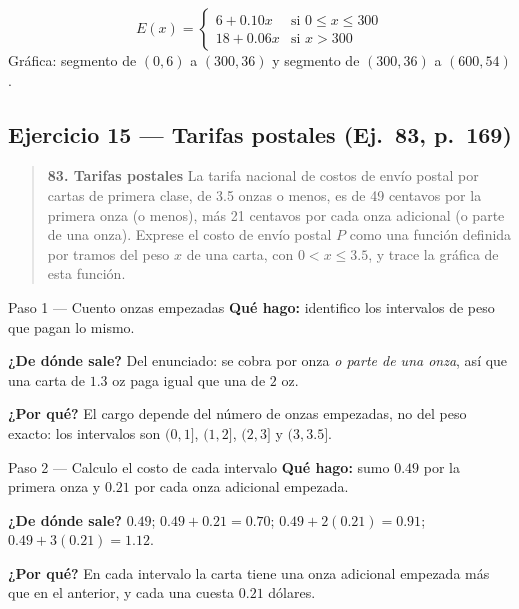 \documentclass[11pt]{article}
\begin{document}
\begin{resp}
\[
E(x)=\begin{cases}6+0.10x & \text{si } 0\le x\le 300\\ 18+0.06x & \text{si } x>300\end{cases}
\]
Gráfica: segmento de $(0,6)$ a $(300,36)$ y segmento de $(300,36)$ a $(600,54)$.
\end{resp}

\subsection*{Ejercicio 15 — Tarifas postales (Ej.~83, p.~169)}

\begin{quote}
\textbf{83. Tarifas postales} \quad La tarifa nacional de costos de envío postal por cartas de primera clase, de 3.5 onzas o menos, es de 49 centavos por la primera onza (o menos), más 21 centavos por cada onza adicional (o parte de una onza). Exprese el costo de envío postal $P$ como una función definida por tramos del peso $x$ de una carta, con $0<x\le 3.5$, y trace la gráfica de esta función.
\end{quote}

\begin{paso}{Paso 1 --- Cuento onzas empezadas}
\textbf{Qué hago:} identifico los intervalos de peso que pagan lo mismo.

\textbf{¿De dónde sale?} Del enunciado: se cobra por onza \emph{o parte de una onza}, así que una carta de $1.3$ oz paga igual que una de $2$ oz.

\textbf{¿Por qué?} El cargo depende del número de onzas empezadas, no del peso exacto: los intervalos son $(0,1]$, $(1,2]$, $(2,3]$ y $(3,3.5]$.
\end{paso}

\begin{paso}{Paso 2 --- Calculo el costo de cada intervalo}
\textbf{Qué hago:} sumo $0.49$ por la primera onza y $0.21$ por cada onza adicional empezada.

\textbf{¿De dónde sale?} $0.49$; $0.49+0.21=0.70$; $0.49+2(0.21)=0.91$; $0.49+3(0.21)=1.12$.

\textbf{¿Por qué?} En cada intervalo la carta tiene una onza adicional empezada más que en el anterior, y cada una cuesta $0.21$ dólares.
\end{paso}
\end{document}
